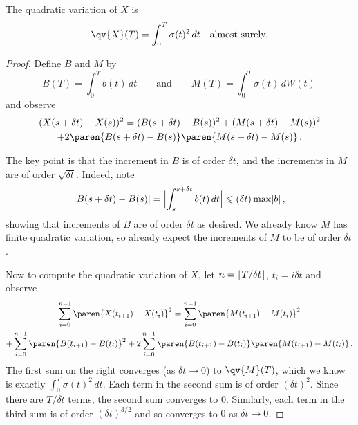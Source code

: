\begin{proposition}
  The quadratic variation of $X$ is
  \begin{equation}\label{e:3qvX}
    \qv{X}(T) = \int_0^T \sigma(t)^2 \, dt
    \quad\text{almost surely.}
  \end{equation}
\end{proposition}
\begin{proof}
  Define $B$ and $M$ by
  \begin{equation*}
    B(T) = \int_0^T b(t) \, dt
    \qquad\text{and}\qquad
    M(T) = \int_0^T \sigma(t) \, dW(t)\,
  \end{equation*}
  and observe
  \begin{multline}\label{e:3incX}
    (X(s + \delta t) - X(s))^2
      = (B(s+\delta t) - B(s))^2 
	+ (M( s + \delta t) - M(s))^2
	\\
	+ 2 \paren{ B(s + \delta t) - B(s) }
	    \paren{ M(s + \delta t) - M(s) }\,.
  \end{multline}

  The key point is that the increment in $B$ is of order $\delta t$, and the increments in $M$ are of order $\sqrt{\delta t}$.
  Indeed, note
  \begin{equation*}
    \abs{B(s + \delta t) - B(s)} = \abs[\Big]{ \int_s^{s + \delta t} b(t) \, dt}
      \leq (\delta t) \max \abs{b}\,,
  \end{equation*}
  showing that increments of $B$ are of order $\delta t$ as desired.
  We already know $M$ has finite quadratic variation, so already expect the increments of $M$ to be of order $\delta t$.

  Now to compute the quadratic variation of $X$, let $n = \floor{T / \delta t}$, $t_i = i \delta t$ and observe
  \begin{multline*}
    \sum_{i=0}^{n-1} \paren{ X(t_{i+1}) - X( t_i ) }^2
      = \sum_{i=0}^{n-1} \paren{ M(t_{i+1}) - M( t_i ) }^2
    \\
    \mathbin+ \sum_{i=0}^{n-1} \paren{ B(t_{i+1}) - B( t_i ) }^2
	+ 2\sum_{i=0}^{n-1}
	    \paren{ B(t_{i+1}) - B( t_i ) }
	    \paren{ M(t_{i+1}) - M( t_i ) }\,.
  \end{multline*}
  The first sum on the right converges (as $\delta t \to 0$) to $\qv{M}(T)$, which we know is exactly $\int_0^T \sigma(t)^2 \, dt$.
  Each term in the second sum is of order $(\delta t)^2$.
  Since there are $T / \delta t$ terms, the second sum converges to $0$.
  Similarly, each term in the third sum is of order $(\delta t)^{3/2}$ and so converges to $0$ as $\delta t \to 0$.
\end{proof}

